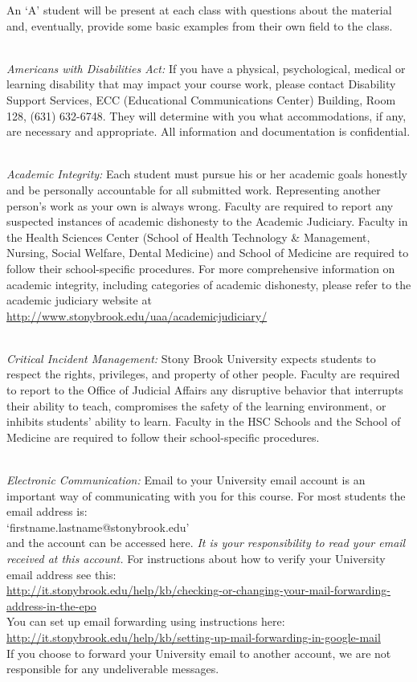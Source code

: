 \documentclass[11pt]{article}
\begin{document}
An `A' student will be present at each class with questions about the 
material and, eventually, provide some basic examples from their own field
to the class.


\clearpage
{} \\

\noindent
{\em Americans with Disabilities Act: } 
%
If you have a physical, psychological, medical or learning disability
that may impact your course work, please contact Disability Support
Services, ECC (Educational Communications Center) Building, Room 128,
(631) 632-6748. They will determine with you what accommodations, if
any, are necessary and appropriate. All information and documentation
is confidential.


\ \\[-1.5mm]
\noindent
{\em Academic Integrity: }
%
Each student must pursue his or her academic goals honestly and be
personally accountable for all submitted work.  Representing another
person's work as your own is always wrong.  Faculty are required to
report any suspected instances of academic dishonesty to the Academic
Judiciary. Faculty in the Health Sciences Center (School of Health
Technology \& Management, Nursing, Social Welfare, Dental Medicine) and
School of Medicine are required to follow their school-specific
procedures. For more comprehensive information on academic integrity,
including categories of academic dishonesty, please refer to the
academic judiciary website at
\url{http://www.stonybrook.edu/uaa/academicjudiciary/}

\ \\[-1.5mm]
\noindent
{\em Critical Incident Management: }
%
Stony Brook University expects students to respect the rights,
privileges, and property of other people. Faculty are required to
report to the Office of Judicial Affairs any disruptive behavior that
interrupts their ability to teach, compromises the safety of the
learning environment, or inhibits students' ability to learn.  Faculty
in the HSC Schools and the School of Medicine are required to follow
their school-specific procedures.

\ \\[-1.5mm]
{\em Electronic Communication: }
%
Email to your University email account is an important way of
communicating with you for this course.  For most students the email
address is:\\[0.25em] `firstname.lastname@stonybrook.edu'\\[0.25em]
and the account can be
accessed here.
{\em It is your responsibility to read your email received at this
  account.}
For instructions about how to verify your University email address see
this: \\[0.25em]
\url{http://it.stonybrook.edu/help/kb/checking-or-changing-your-mail-forwarding-address-in-the-epo} \\[0.25em]
%
You can set up email forwarding using instructions here: \\[0.25em]
\url{http://it.stonybrook.edu/help/kb/setting-up-mail-forwarding-in-google-mail}
\\[0.25em]
%
If you choose to forward your University email to another account, we
are not responsible for any undeliverable messages.
\end{document}
